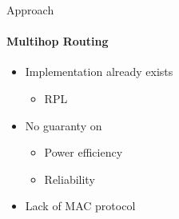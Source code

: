 \begin{frame}{Approach}
\framesubtitle{Multihop Routing}

\begin{itemize}
    \item Implementation already exists
    \begin{itemize}
        \item RPL
    \end{itemize}
    \item No guaranty on
    \begin{itemize}
        \item Power efficiency
        \item Reliability
    \end{itemize}
    \item Lack of MAC protocol
\end{itemize}
\end{frame}

